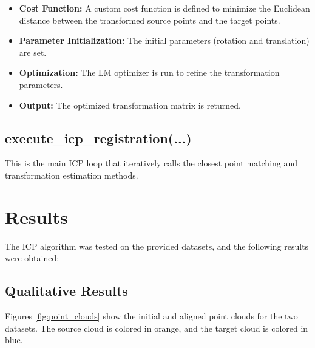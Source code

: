 \documentclass{article}
\begin{document}
\begin{itemize}
    \item \textbf{Cost Function:} A custom cost function is defined to minimize the Euclidean distance between the transformed source points and the target points.
    \item \textbf{Parameter Initialization:} The initial parameters (rotation and translation) are set.
    \item \textbf{Optimization:} The LM optimizer is run to refine the transformation parameters.
    \item \textbf{Output:} The optimized transformation matrix is returned.
\end{itemize}

\subsection{execute\_icp\_registration(...)}
This is the main ICP loop that iteratively calls the closest point matching and transformation estimation methods.




\section{Results}
The ICP algorithm was tested on the provided datasets, and the following results were obtained:

\subsection{Qualitative Results}
Figures \ref{fig:point_clouds} show the initial and aligned point clouds for the two datasets. The source cloud is colored in orange, and the target cloud is colored in blue.
\end{document}
